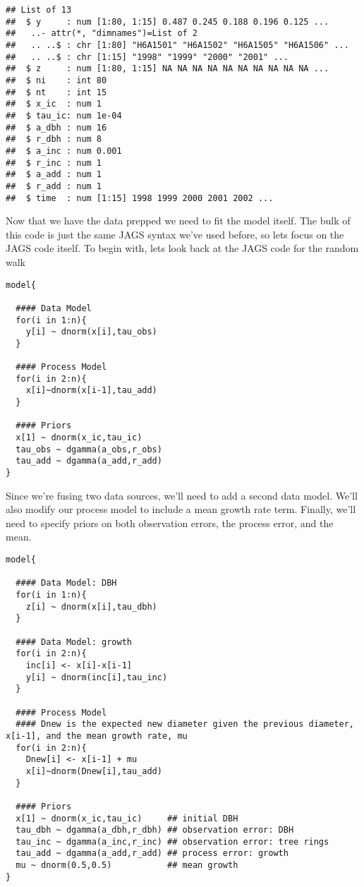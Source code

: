 \documentclass[]{article}
\begin{document}
\begin{verbatim}
## List of 13
##  $ y     : num [1:80, 1:15] 0.487 0.245 0.188 0.196 0.125 ...
##   ..- attr(*, "dimnames")=List of 2
##   .. ..$ : chr [1:80] "H6A1501" "H6A1502" "H6A1505" "H6A1506" ...
##   .. ..$ : chr [1:15] "1998" "1999" "2000" "2001" ...
##  $ z     : num [1:80, 1:15] NA NA NA NA NA NA NA NA NA NA ...
##  $ ni    : int 80
##  $ nt    : int 15
##  $ x_ic  : num 1
##  $ tau_ic: num 1e-04
##  $ a_dbh : num 16
##  $ r_dbh : num 8
##  $ a_inc : num 0.001
##  $ r_inc : num 1
##  $ a_add : num 1
##  $ r_add : num 1
##  $ time  : num [1:15] 1998 1999 2000 2001 2002 ...
\end{verbatim}

Now that we have the data prepped we need to fit the model itself. The
bulk of this code is just the same JAGS syntax we've used before, so
lets focus on the JAGS code itself. To begin with, lets look back at the
JAGS code for the random walk

\begin{verbatim}
model{
  
  #### Data Model
  for(i in 1:n){
    y[i] ~ dnorm(x[i],tau_obs)
  }
  
  #### Process Model
  for(i in 2:n){
    x[i]~dnorm(x[i-1],tau_add)
  }
  
  #### Priors
  x[1] ~ dnorm(x_ic,tau_ic)
  tau_obs ~ dgamma(a_obs,r_obs)
  tau_add ~ dgamma(a_add,r_add)
}
\end{verbatim}

Since we're fusing two data sources, we'll need to add a second data
model. We'll also modify our process model to include a mean growth rate
term. Finally, we'll need to specify priors on both observation errors,
the process error, and the mean.

\begin{verbatim}
model{

  #### Data Model: DBH
  for(i in 1:n){
    z[i] ~ dnorm(x[i],tau_dbh)
  }

  #### Data Model: growth
  for(i in 2:n){
    inc[i] <- x[i]-x[i-1]
    y[i] ~ dnorm(inc[i],tau_inc)
  }

  #### Process Model
  #### Dnew is the expected new diameter given the previous diameter, x[i-1], and the mean growth rate, mu
  for(i in 2:n){
    Dnew[i] <- x[i-1] + mu  
    x[i]~dnorm(Dnew[i],tau_add)
  }

  #### Priors
  x[1] ~ dnorm(x_ic,tau_ic)     ## initial DBH
  tau_dbh ~ dgamma(a_dbh,r_dbh) ## observation error: DBH
  tau_inc ~ dgamma(a_inc,r_inc) ## observation error: tree rings
  tau_add ~ dgamma(a_add,r_add) ## process error: growth
  mu ~ dnorm(0.5,0.5)           ## mean growth
}
\end{verbatim}
\end{document}
